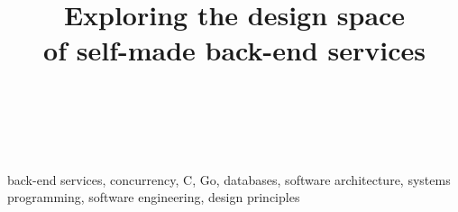\documentclass[journal]{IEEEtran}
\begin{document}
\title{Exploring the design space \\of self-made back-end services}

\author{\\
\\
}

\maketitle


\begin{IEEEkeywords}
back-end services, concurrency, C, Go, databases, software architecture, systems programming, software engineering, design principles
\end{IEEEkeywords}





%



\nocite{*}

\end{document}
